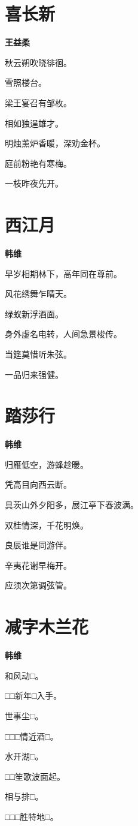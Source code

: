 \documentclass[12pt,a4paper]{ctexbook}
\begin{document}
\section{喜长新}
\textbf{王益柔}\par\vspace{0.5em}
秋云朔吹晓徘徊。\par
雪照楼台。\par
梁王宴召有邹枚。\par
相如独逞雄才。\par
明烛薰炉香暖，深劝金杯。\par
庭前粉艳有寒梅。\par
一枝昨夜先开。\par

\section{西江月}
\textbf{韩维}\par\vspace{0.5em}
早岁相期林下，高年同在尊前。\par
风花绣舞乍晴天。\par
绿蚁新浮酒面。\par
身外虚名电转，人间急景梭传。\par
当筵莫惜听朱弦。\par
一品归来强健。\par

\section{踏莎行}
\textbf{韩维}\par\vspace{0.5em}
归雁低空，游蜂趁暖。\par
凭高目向西云断。\par
具茨山外夕阳多，展江亭下春波满。\par
双桂情深，千花明焕。\par
良辰谁是同游伴。\par
辛夷花谢早梅开。\par
应须次第调弦管。\par

\section{减字木兰花}
\textbf{韩维}\par\vspace{0.5em}
和风动□。\par
□□新年□入手。\par
世事尘□。\par
□□□情近酒□。\par
水开湖□。\par
□□笙歌波面起。\par
相与排□。\par
□□□胜特地□。\par
\end{document}
